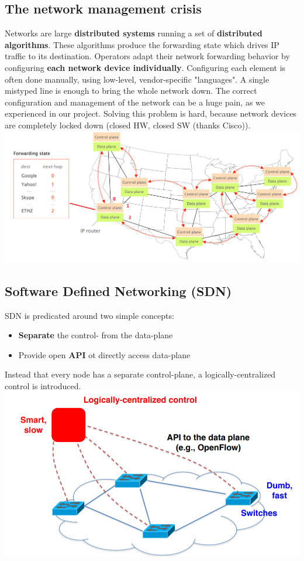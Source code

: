 \documentclass[a4paper, fontsize=8pt, landscape, DIV=1]{scrartcl}
\begin{document}
\begin{multicols*}{4}
		\subsection{The network management crisis} 
		Networks are large \textbf{distributed systems} running a set of \textbf{distributed algorithms}. These algorithms produce the forwarding state which drives IP traffic to its destination. Operators adapt their network forwarding behavior by configuring \textbf{each network device individually}. Configuring each element is often done manually, using low-level, vendor-specific "languages". A single mistyped line is enough to bring the whole network down. The correct configuration and management of the network can be a huge pain, as we experienced in our project. Solving this problem is hard, because network devices are completely locked down (closed HW, closed SW (thanks Cisco)).\\ 
		\includegraphics[width=\columnwidth]{images/Programmable_Networks/distributed_stuff.png}
		
		\subsection{Software Defined Networking (SDN)}
		SDN is predicated around two simple concepts:
		\begin{itemize}[noitemsep]
			\item \textbf{Separate} the control- from the data-plane
			\item Provide open \textbf{API} ot directly access data-plane
		\end{itemize}
		Instead that every node has a separate control-plane, a logically-centralized control is introduced.\\
		\includegraphics[width=\columnwidth]{images/Programmable_Networks/sdn_principle.png}
	

\end{multicols*}
\end{document}
